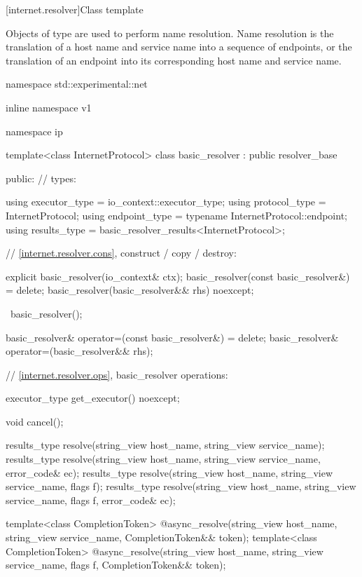 %
[internet.resolver]{Class template }

\pnum
Objects of type  are used to perform name resolution. Name resolution is the translation of a host name and service name into a sequence of endpoints, or the translation of an endpoint into its corresponding host name and service name.

\begin{codeblock}
namespace std::experimental::net {
inline namespace v1 {
namespace ip {

  template<class InternetProtocol>
  class basic_resolver : public resolver_base
  {
  public:
    // types:

    using executor_type = io_context::executor_type;
    using protocol_type = InternetProtocol;
    using endpoint_type = typename InternetProtocol::endpoint;
    using results_type = basic_resolver_results<InternetProtocol>;

    // \ref{internet.resolver.cons}, construct / copy / destroy:

    explicit basic_resolver(io_context& ctx);
    basic_resolver(const basic_resolver&) = delete;
    basic_resolver(basic_resolver&& rhs) noexcept;

    ~basic_resolver();

    basic_resolver& operator=(const basic_resolver&) = delete;
    basic_resolver& operator=(basic_resolver&& rhs);

    // \ref{internet.resolver.ops}, basic_resolver operations:

    executor_type get_executor() noexcept;

    void cancel();

    results_type resolve(string_view host_name, string_view service_name);
    results_type resolve(string_view host_name, string_view service_name,
                         error_code& ec);
    results_type resolve(string_view host_name, string_view service_name,
                         flags f);
    results_type resolve(string_view host_name, string_view service_name,
                         flags f, error_code& ec);

    template<class CompletionToken>
      @\DEDUCED@ async_resolve(string_view host_name, string_view service_name,
                            CompletionToken&& token);
    template<class CompletionToken>
      @\DEDUCED@ async_resolve(string_view host_name, string_view service_name,
                            flags f, CompletionToken&& token);

}}}}
\end{codeblock}
